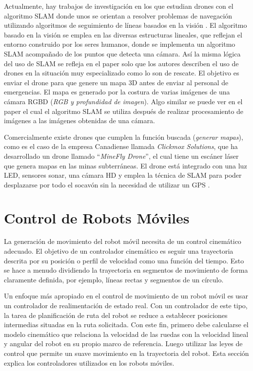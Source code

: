 Actualmente, hay trabajos de investigación en los que estudian drones con el algoritmo SLAM 
donde unos se orientan a resolver problemas de navegación utilizando algoritmos de seguimiento 
de líneas basados en la visión \cite{Verschoor2013}. El algoritmo basado en la visión se 
emplea en las diversas estructuras lineales, que reflejan el entorno construido por los 
seres humanos, donde se implementa un algoritmo SLAM acompañado de los puntos que detecta 
una cámara. Así la misma lógica del uso de SLAM se refleja en el paper \cite{Skoda2015} 
solo que los autores describen el uso de drones en la situación muy especializado como lo 
son de rescate. El objetivo es enviar el drone para que genere un mapa 3D antes de enviar 
al personal de emergencias. El mapa es generado por la costura de varias imágenes de una 
cámara RGBD (\textit{RGB y profundidad de imagen}). Algo similar se puede ver en el 
paper \cite{Heukels2015} el cual el algoritmo SLAM se utiliza después de realizar 
procesamiento de imágenes a las imágenes obtenidas de una cámara.

Comercialmente existe drones que cumplen la función buscada (\textit{generar mapas}), como 
es el caso de la empresa Canadiense llamada \textit{Clickmox Solutions}, que ha 
desarrollado un drone llamado “\textit{MineFly Drone}”, el cual tiene un escáner 
láser que genera mapas en las minas subterráneas. El drone está integrado con una 
luz LED, sensores sonar, una cámara HD y emplea la técnica de SLAM para poder 
desplazarse por todo el socavón sin la necesidad de utilizar un GPS \cite{Solutions2016}. 


\section{Control de Robots M\'oviles}

La generaci\'on de movimiento del robot m\'ovil necesita de un control cinem\'atico 
adecuado. El objetivo de un controlador cinem\'atico es seguir una trayectoria descrita 
por su posici\'on o perfil de velocidad como una funci\'on del tiempo. Esto se hace 
a menudo dividiendo la trayectoria en segmentos de movimiento de forma claramente 
definida, por ejemplo, l\'ineas rectas y segmentos de un c\'irculo.

Un enfoque m\'as apropiado en el control de movimiento de un robot m\'ovil es usar 
un controlador de realimentaci\'on de estado real. Con un controlador de este tipo, 
la tarea de planificaci\'on de ruta del robot se reduce a establecer posiciones 
intermedias situadas en la ruta solicitada. Con este fin, primero debe calcularse 
el modelo cinem\'atico que relaciona la velocidad de las ruedas con la velocidad 
lineal y angular del robot en su propio marco de referencia. Luego utilizar las 
leyes de control que permite un suave movimiento en la trayectoria del robot. Esta 
secci\'on explica los controladores utilizados en los robots m\'oviles.

